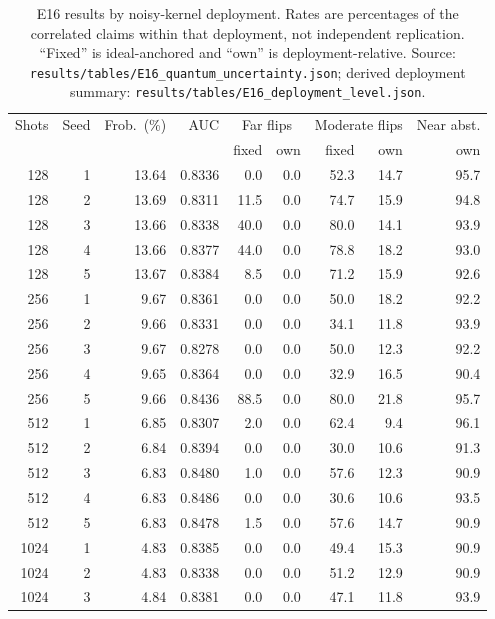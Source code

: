 \documentclass[11pt,a4paper]{article}
\begin{document}
\clearpage
\begin{table}[H]
\centering
\scriptsize
\setlength{\tabcolsep}{3pt}
\caption{E16 results by noisy-kernel deployment. Rates are percentages of the
correlated claims within that deployment, not independent replication. ``Fixed''
is ideal-anchored and ``own'' is deployment-relative. Source:
\texttt{results/tables/E16\_quantum\_uncertainty.json}; derived deployment
summary: \texttt{results/tables/E16\_deployment\_level.json}.}
\label{tab:e16}
\begin{tabular}{rrrrrrrrr}
\toprule
Shots & Seed & Frob.\ (\%) & AUC & \multicolumn{2}{c}{Far flips} & \multicolumn{2}{c}{Moderate flips} & Near abst. \\
 & & & & fixed & own & fixed & own & own \\
\midrule
128 & 1 & 13.64 & 0.8336 & 0.0 & 0.0 & 52.3 & 14.7 & 95.7 \\
128 & 2 & 13.69 & 0.8311 & 11.5 & 0.0 & 74.7 & 15.9 & 94.8 \\
128 & 3 & 13.66 & 0.8338 & 40.0 & 0.0 & 80.0 & 14.1 & 93.9 \\
128 & 4 & 13.66 & 0.8377 & 44.0 & 0.0 & 78.8 & 18.2 & 93.0 \\
128 & 5 & 13.67 & 0.8384 & 8.5 & 0.0 & 71.2 & 15.9 & 92.6 \\
256 & 1 & 9.67 & 0.8361 & 0.0 & 0.0 & 50.0 & 18.2 & 92.2 \\
256 & 2 & 9.66 & 0.8331 & 0.0 & 0.0 & 34.1 & 11.8 & 93.9 \\
256 & 3 & 9.67 & 0.8278 & 0.0 & 0.0 & 50.0 & 12.3 & 92.2 \\
256 & 4 & 9.65 & 0.8364 & 0.0 & 0.0 & 32.9 & 16.5 & 90.4 \\
256 & 5 & 9.66 & 0.8436 & 88.5 & 0.0 & 80.0 & 21.8 & 95.7 \\
512 & 1 & 6.85 & 0.8307 & 2.0 & 0.0 & 62.4 & 9.4 & 96.1 \\
512 & 2 & 6.84 & 0.8394 & 0.0 & 0.0 & 30.0 & 10.6 & 91.3 \\
512 & 3 & 6.83 & 0.8480 & 1.0 & 0.0 & 57.6 & 12.3 & 90.9 \\
512 & 4 & 6.83 & 0.8486 & 0.0 & 0.0 & 30.6 & 10.6 & 93.5 \\
512 & 5 & 6.83 & 0.8478 & 1.5 & 0.0 & 57.6 & 14.7 & 90.9 \\
1024 & 1 & 4.83 & 0.8385 & 0.0 & 0.0 & 49.4 & 15.3 & 90.9 \\
1024 & 2 & 4.83 & 0.8338 & 0.0 & 0.0 & 51.2 & 12.9 & 90.9 \\
1024 & 3 & 4.84 & 0.8381 & 0.0 & 0.0 & 47.1 & 11.8 & 93.9 \\

\end{tabular}
\end{table}
\end{document}
